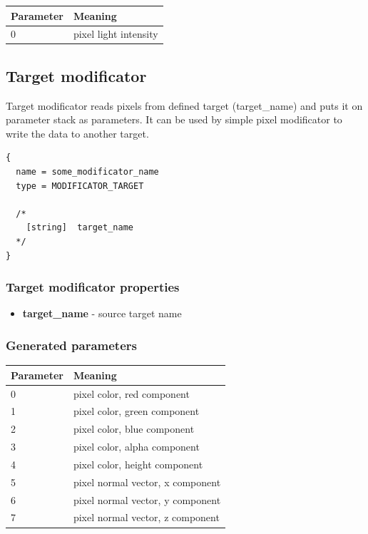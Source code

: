 \documentclass[9pt]{article}
\begin{document}
\begin{center}
\begin{tabular}{|l||l|}
\hline
  Parameter & Meaning \\
\hline  
\hline  
  0 & pixel light intensity \\
\hline
\end{tabular}
\end{center}

\newpage
\subsection{Target modificator}

Target modificator reads pixels from defined target (target\_name) and
puts it on parameter stack as parameters. It can be used by simple pixel modificator 
to write the data to another target.

\begin{verbatim}
{
  name = some_modificator_name
  type = MODIFICATOR_TARGET

  /*      
    [string]  target_name
  */
}
\end{verbatim}
\subsubsection*{Target modificator properties}
\begin{itemize}
\item{\bf target\_name} - source target name
\end{itemize}

\subsubsection*{Generated parameters}

\begin{center}
\begin{tabular}{|l||l|}
\hline
  Parameter & Meaning \\
\hline  
\hline  
  0 & pixel color, red component \\
  1 & pixel color, green component \\
  2 & pixel color, blue component \\
  3 & pixel color, alpha component \\
  4 & pixel color, height component \\
  5 & pixel normal vector, x component \\
  6 & pixel normal vector, y component \\
  7 & pixel normal vector, z component \\
\hline
\end{tabular}
\end{center}
\end{document}
